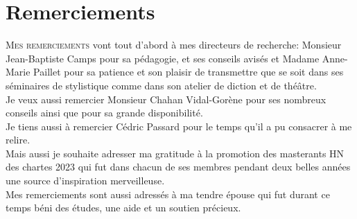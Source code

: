 \chapter*{Remerciements}
\bigskip
\lettrine{M}{es remerciements} vont tout d'abord à mes directeurs de recherche: Monsieur Jean-Baptiste Camps pour sa pédagogie, et ses conseils avisés et Madame Anne-Marie Paillet pour sa patience et son plaisir de transmettre que se soit dans ses séminaires de stylistique comme dans son atelier de diction et de théâtre. \\
Je veux aussi remercier Monsieur Chahan Vidal-Gorène pour ses nombreux conseils ainsi que pour sa grande disponibilité.\\
Je tiens aussi à remercier Cédric Passard pour le temps qu'il a pu consacrer à me relire.\\
Mais aussi je souhaite adresser ma gratitude à la promotion des masterants HN des chartes 2023 qui fut dans chacun de ses membres pendant deux belles années une source d'inspiration merveilleuse.\\
Mes remerciements sont aussi adressés à ma tendre épouse qui fut durant ce temps béni des études, une aide et un soutien précieux.